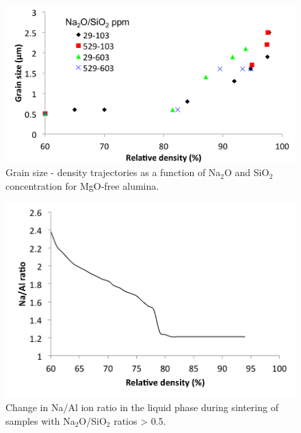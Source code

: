 \newpage
\begin{figure}[H]
	\centering
	\includegraphics[width=\textwidth]{Chapter-4/Figures/Figure4.png}
	\caption{Grain size - density trajectories as a function of Na$_{2}$O and SiO$_{2}$ concentration for MgO-free alumina.}
	\label{Ch4-figure:Figure4}
\end{figure}

\newpage
\begin{figure}[H]
	\centering
	\includegraphics[width=\textwidth]{Chapter-4/Figures/Figure5.png}
	\caption{Change in Na/Al ion ratio in the liquid phase during sintering of samples with Na$_{2}$O/SiO$_{2}$ ratios > 0.5.}
	\label{Ch4-figure:Figure5}
\end{figure}

